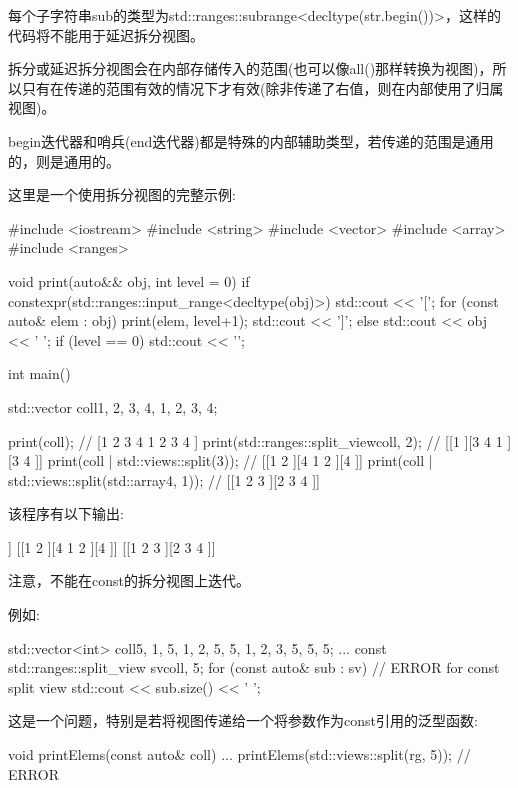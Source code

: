 每个子字符串sub的类型为std::ranges::subrange<decltype(str.begin())>，这样的代码将不能用于延迟拆分视图。

拆分或延迟拆分视图会在内部存储传入的范围(也可以像all()那样转换为视图)，所以只有在传递的范围有效的情况下才有效(除非传递了右值，则在内部使用了归属视图)。

begin迭代器和哨兵(end迭代器)都是特殊的内部辅助类型，若传递的范围是通用的，则是通用的。

这里是一个使用拆分视图的完整示例:


\begin{cpp}
#include <iostream>
#include <string>
#include <vector>
#include <array>
#include <ranges>

void print(auto&& obj, int level = 0)
{
	if constexpr(std::ranges::input_range<decltype(obj)>) {
		std::cout << '[';
		for (const auto& elem : obj) {
			print(elem, level+1);
		}
		std::cout << ']';
	}
	else {
		std::cout << obj << ' ';
	}
	if (level == 0) std::cout << '\n';
}

int main()
{
	std::vector coll{1, 2, 3, 4, 1, 2, 3, 4};
	
	print(coll); // [1 2 3 4 1 2 3 4 ]
	print(std::ranges::split_view{coll, 2}); // [[1 ][3 4 1 ][3 4 ]]
	print(coll | std::views::split(3)); // [[1 2 ][4 1 2 ][4 ]]
	print(coll | std::views::split(std::array{4, 1})); // [[1 2 3 ][2 3 4 ]]
}
\end{cpp}

该程序有以下输出:

\begin{shell}
[1 2 3 4 1 2 3 4 ]
[[1 ][3 4 1 ][3 4 ]]
[[1 2 ][4 1 2 ][4 ]]
[[1 2 3 ][2 3 4 ]]
\end{shell}


注意，不能在const的拆分视图上迭代。

例如:

\begin{cpp}
std::vector<int> coll{5, 1, 5, 1, 2, 5, 5, 1, 2, 3, 5, 5, 5};
...
const std::ranges::split_view sv{coll, 5};
for (const auto& sub : sv) { // ERROR for const split view
	std::cout << sub.size() << ' ';
}
\end{cpp}

这是一个问题，特别是若将视图传递给一个将参数作为const引用的泛型函数:

\begin{cpp}
void printElems(const auto& coll) {
	...
}
printElems(std::views::split(rg, 5)); // ERROR
\end{cpp}

